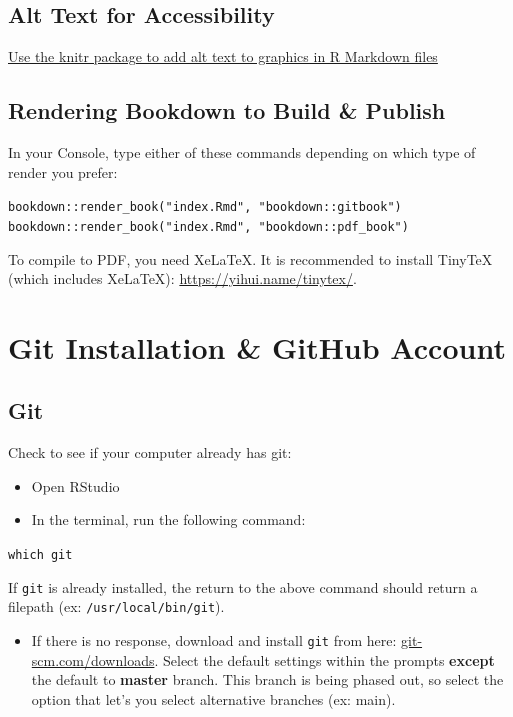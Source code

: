 \documentclass[
]{book}
\providecommand{\tightlist}{%
  \setlength{\itemsep}{0pt}\setlength{\parskip}{0pt}}
\begin{document}
\hypertarget{alt-text-for-accessibility}{%
\section{Alt Text for Accessibility}\label{alt-text-for-accessibility}}

\href{https://www.rstudio.com/blog/knitr-fig-alt/}{Use the knitr package to add alt text to graphics in R Markdown files}

\hypertarget{rendering-bookdown-to-build-publish}{%
\section{Rendering Bookdown to Build \& Publish}\label{rendering-bookdown-to-build-publish}}

In your Console, type either of these commands depending on which type of render you prefer:

\texttt{bookdown::render\_book("index.Rmd",\ "bookdown::gitbook")}
\texttt{bookdown::render\_book("index.Rmd",\ "bookdown::pdf\_book")}

To compile to PDF, you need XeLaTeX. It is recommended to install TinyTeX (which includes XeLaTeX): \url{https://yihui.name/tinytex/}.

\hypertarget{git}{%
\chapter{Git Installation \& GitHub Account}\label{git}}

\hypertarget{git-1}{%
\section{Git}\label{git-1}}

Check to see if your computer already has git:

\begin{itemize}
\tightlist
\item
  Open RStudio
\item
  In the terminal, run the following command:
\end{itemize}

\texttt{which\ git}

If \texttt{git} is already installed, the return to the above command should return a filepath (ex: \texttt{/usr/local/bin/git}).

\begin{itemize}
\tightlist
\item
  If there is no response, download and install \texttt{git} from here: \href{https://git-scm.com/downloads}{git-scm.com/downloads}. Select the default settings within the prompts \textbf{except} the default to \textbf{master} branch. This branch is being phased out, so select the option that let's you select alternative branches (ex: main).
\end{itemize}
\end{document}
